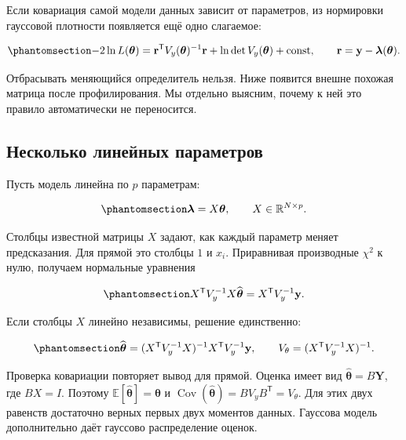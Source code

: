 \documentclass[
  russian,
  11pt,
  a4paper,
  open=any]{scrbook}
\begin{document}
Если ковариация самой модели данных зависит от параметров, из нормировки
гауссовой плотности появляется ещё одно слагаемое:

\begin{equation}\protect\phantomsection\label{eq-ch12-gaussian-variable-covariance}{
-2\ln L(\boldsymbol\theta)
=\mathbf r^{\mathsf T}V_y(\boldsymbol\theta)^{-1}\mathbf r
+\ln\det V_y(\boldsymbol\theta)+\mathrm{const},
\qquad
\mathbf r=\mathbf y-\boldsymbol\lambda(\boldsymbol\theta).
}\end{equation}

Отбрасывать меняющийся определитель нельзя. Ниже появится внешне похожая
матрица после профилирования. Мы отдельно выясним, почему к ней это
правило автоматически не переносится.

\subsection{Несколько линейных
параметров}\label{ux43dux435ux441ux43aux43eux43bux44cux43aux43e-ux43bux438ux43dux435ux439ux43dux44bux445-ux43fux430ux440ux430ux43cux435ux442ux440ux43eux432}

Пусть модель линейна по \(p\) параметрам:

\begin{equation}\protect\phantomsection\label{eq-ch12-linear-model}{
\boldsymbol\lambda=X\boldsymbol\theta,
\qquad X\in\mathbb R^{N\times p}.
}\end{equation}

Столбцы известной матрицы \(X\) задают, как каждый параметр меняет
предсказания. Для прямой это столбцы \(1\) и \(x_i\). Приравнивая
производные \(\chi^2\) к нулю, получаем нормальные уравнения

\begin{equation}\protect\phantomsection\label{eq-ch12-general-normal-equations}{
X^{\mathsf T}V_y^{-1}X\widehat{\boldsymbol\theta}
=X^{\mathsf T}V_y^{-1}\mathbf y.
}\end{equation}

Если столбцы \(X\) линейно независимы, решение единственно:

\begin{equation}\protect\phantomsection\label{eq-ch12-linear-estimate-covariance}{
\widehat{\boldsymbol\theta}
=(X^{\mathsf T}V_y^{-1}X)^{-1}X^{\mathsf T}V_y^{-1}\mathbf y,
\qquad
V_\theta=(X^{\mathsf T}V_y^{-1}X)^{-1}.
}\end{equation}

Проверка ковариации повторяет вывод для прямой. Оценка имеет вид
\(\widehat{\boldsymbol\theta}=B\mathbf Y\), где \(BX=I\). Поэтому
\(\mathbb E[\widehat{\boldsymbol\theta}]=\boldsymbol\theta\) и
\(\operatorname{Cov}(\widehat{\boldsymbol\theta})=BV_yB^{\mathsf T}=V_\theta\).
Для этих двух равенств достаточно верных первых двух моментов данных.
Гауссова модель дополнительно даёт гауссово распределение оценок.
\end{document}
